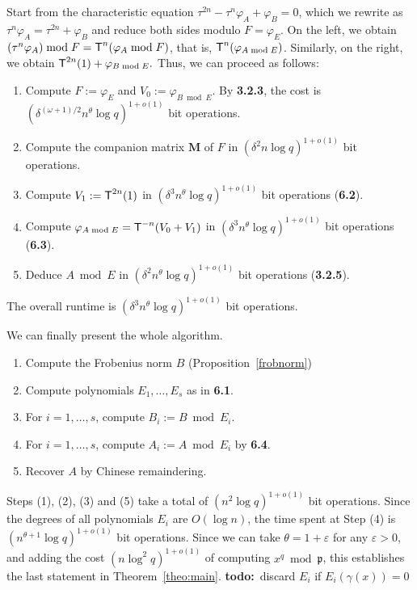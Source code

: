 \documentclass[sigconf]{acmart}
\newcommand{\frakp}{\mathfrak{p}}
\newcommand{\todo}{{\bf todo:}~}
\begin{document}
Start from the characteristic equation $\tau^{2n} - \tau^n \varphi_A +
\varphi_B=0$, which we rewrite as $\tau^n \varphi_A = \tau^{2n} +
\varphi_B$ and reduce both sides modulo $F=\varphi_E$. On the left, we
obtain $(\tau^n \varphi_A) \bmod F = \text{\sf T}^n(\varphi_A \bmod
F)$, that is, $\text{\sf T}^n(\varphi_{A \bmod E})$. Similarly, on the
right, we obtain $\text{\sf T}^{2n}(1) + \varphi_{B \bmod E}.$ Thus, we can
proceed as follows:
\begin{enumerate}
\item Compute $F:=\varphi_E$ and $V_0:=\varphi_{B \bmod E}$. By
  {\bf 3.2.3}, the cost is
  $(\delta^{(\omega+1)/2} n^\theta \log q)^{1+o(1)}$ bit operations.
\item Compute the companion matrix ${\bm M}$ of $F$ in 
  $(\delta^2 n \log q)^{1+o(1)}$ bit operations.
\item Compute $V_1:=\text{\sf T}^{2n}(1)$ in $(\delta^3 n^\theta \log
  q)^{1+o(1)}$ bit operations ({\bf 6.2}).
\item Compute $\varphi_{A \bmod E}=\text{\sf T}^{-n}(V_0+V_1)$ in $(\delta^3
  n^\theta \log q)^{1+o(1)}$ bit operations ({\bf 6.3}).
\item Deduce $A \bmod E$ in $(\delta^2 n^\theta \log q)^{1+o(1)}$ bit
  operations ({\bf 3.2.5}).
\end{enumerate}
The overall runtime is $(\delta^3 n^\theta \log q)^{1+o(1)}$ bit
operations.

\smallskip{} We can finally present the
whole algorithm. 
\begin{enumerate}
\item Compute the Frobenius norm $B$ (Proposition~\ref{frobnorm})
\item Compute polynomials $E_1,\dots,E_s$ as in {\bf 6.1}.
\item For $i=1,\dots,s$, compute $B_i:=B \bmod E_i$.
\item For $i=1,\dots,s$, compute $A_i:=A \bmod E_i$ by {\bf 6.4}.
\item Recover $A$ by Chinese remaindering.
\end{enumerate}
Steps (1), (2), (3) and (5) take a total of $(n^2 \log q)^{1+o(1)}$
bit operations. Since the degrees of all polynomials $E_i$ are $O(\log
n)$, the time spent at Step (4) is $(n^{\theta+1} \log
q)^{1+o(1)}$ bit operations. Since we can take $\theta = 1+\varepsilon$ 
for any $\varepsilon > 0$, and adding the cost
$(n \log^2 q)^{1+o(1)}$
 of computing $x^q \bmod \frakp$, 
this establishes the last statement in Theorem~\ref{theo:main}.
\todo{discard $E_i$ if $E_i(\gamma(x)) =0$}
\end{document}
